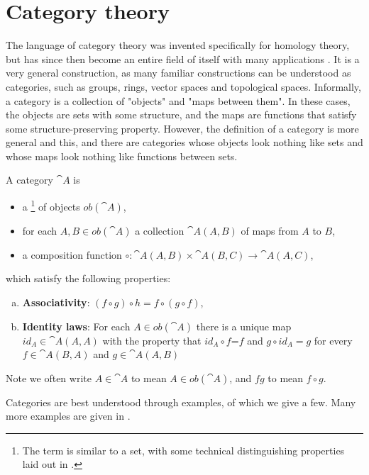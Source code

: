 \section{Category theory}\label{sec-category-theory}
The language of category theory was invented specifically for homology theory, but has since then become an entire field of itself with many applications \cite{Marquis}. It is a very general construction, as many familiar constructions can be understood as categories, such as groups, rings, vector spaces and topological spaces. Informally, a category is a collection of "objects" and "maps between them". In these cases, the objects are sets with some structure, and the maps are functions that satisfy some structure-preserving property. However, the definition of a category is more general and this, and there are categories whose objects look nothing like sets and whose maps look nothing like functions between sets.

\begin{definition}
A category $\cat{A}$ is
\begin{itemize}
    \item a \footnote{The term  is similar to a set, with some technical distinguishing properties laid out in \cite{Leinster}.} of objects $ob(\cat{A})$,
    \item for each $A,B\in ob(\cat{A})$ a collection $\cat{A}(A,B)$ of maps from $A$ to $B$,
    \item a composition function $\circ:\cat{A}(A,B)\times \cat{A}(B,C)\rightarrow \cat{A}(A,C)$,
\end{itemize}
which satisfy the following properties:

\begin{enumerate}[(a)]
\item \textbf{Associativity}: $(f\circ g)\circ h=f\circ(g\circ f)$,
\item \textbf{Identity laws}: For each $A\in ob(\cat{A})$ there is a unique map $id_A\in \cat{A}(A,A)$ with the property that $id_A\circ f$=$f$ and $g\circ id_A=g$ for every $f\in \cat{A}(B,A)$ and $g\in \cat{A}(A,B)$
\end{enumerate}
\end{definition}
Note we often write $A\in \cat{A}$ to mean $A\in ob(\cat{A})$, and $fg$ to mean $f\circ g$.
\par Categories are best understood through examples, of which we give a few. Many more examples are given in \cite{Leinster}.

